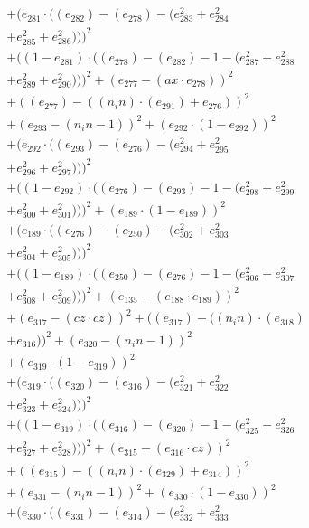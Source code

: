 \documentclass[10pt, a4paper]{article}
\begin{document}
\begin{small}
\begin{align*}
& + (e_{281}  \cdot  ((e_{282}) - (e_{278}) - (e_{283}^{2} + e_{284}^{2} \\
& + e_{285}^{2} + e_{286}^{2})))^{2} \\
& + ((1 - e_{281})  \cdot  ((e_{278}) - (e_{282}) - 1 - (e_{287}^{2} + e_{288}^{2} \\
& + e_{289}^{2} + e_{290}^{2})))^{2} + (e_{277} - (ax  \cdot  e_{278}))^{2} \\
& + ((e_{277}) - ((n_in)  \cdot  (e_{291}) + e_{276}))^{2} \\
& + (e_{293} - (n_in - 1))^{2} + (e_{292}  \cdot  (1 - e_{292}))^{2} \\
& + (e_{292}  \cdot  ((e_{293}) - (e_{276}) - (e_{294}^{2} + e_{295}^{2} \\
& + e_{296}^{2} + e_{297}^{2})))^{2} \\
& + ((1 - e_{292})  \cdot  ((e_{276}) - (e_{293}) - 1 - (e_{298}^{2} + e_{299}^{2} \\
& + e_{300}^{2} + e_{301}^{2})))^{2} + (e_{189}  \cdot  (1 - e_{189}))^{2} \\
& + (e_{189}  \cdot  ((e_{276}) - (e_{250}) - (e_{302}^{2} + e_{303}^{2} \\
& + e_{304}^{2} + e_{305}^{2})))^{2} \\
& + ((1 - e_{189})  \cdot  ((e_{250}) - (e_{276}) - 1 - (e_{306}^{2} + e_{307}^{2} \\
& + e_{308}^{2} + e_{309}^{2})))^{2} + (e_{135} - (e_{188}  \cdot  e_{189}))^{2} \\
& + (e_{317} - (cz  \cdot  cz))^{2} + ((e_{317}) - ((n_in)  \cdot  (e_{318}) \\
& + e_{316}))^{2} + (e_{320} - (n_in - 1))^{2} \\
& + (e_{319}  \cdot  (1 - e_{319}))^{2} \\
& + (e_{319}  \cdot  ((e_{320}) - (e_{316}) - (e_{321}^{2} + e_{322}^{2} \\
& + e_{323}^{2} + e_{324}^{2})))^{2} \\
& + ((1 - e_{319})  \cdot  ((e_{316}) - (e_{320}) - 1 - (e_{325}^{2} + e_{326}^{2} \\
& + e_{327}^{2} + e_{328}^{2})))^{2} + (e_{315} - (e_{316}  \cdot  cz))^{2} \\
& + ((e_{315}) - ((n_in)  \cdot  (e_{329}) + e_{314}))^{2} \\
& + (e_{331} - (n_in - 1))^{2} + (e_{330}  \cdot  (1 - e_{330}))^{2} \\
& + (e_{330}  \cdot  ((e_{331}) - (e_{314}) - (e_{332}^{2} + e_{333}^{2} \\

\end{align*}
\end{small}
\end{document}
